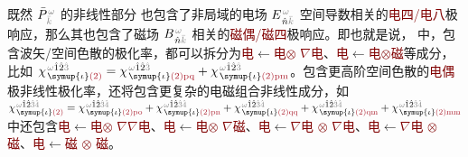 既然 $\bar{P}^{\;\!\mathcolor{gray}{\omega}}_{\;\!\mathcolor{gray}{\bar{k}}}$ 的非线性部分  也包含了非局域的电场 $E^{\;\!\mathcolor{gray}{\omega}}_{\;\! \hat{n} \mathcolor{gray}{\bar{k}}}$ 空间导数相关的\textcolor{Maroon}{电四/电八}极响应，那么其也包含了磁场 $B^{\;\!\mathcolor{gray}{\omega}}_{\;\! \hat{n} \mathcolor{gray}{\bar{k}}}$ 相关的\textcolor{Maroon}{磁偶/磁四}极响应。即也就是说， 中，包含波矢/空间色散的极化率，都可以拆分为\textcolor{Maroon}{电}$\leftarrow$\textcolor{Maroon}{电$\otimes$ $\nabla \text{电}$}、\textcolor{Maroon}{电}$\leftarrow$\textcolor{Maroon}{电$\otimes$磁}等成分，比如 $\chi^{\;\! \mathcolor{gray}{\omega} \hat{1} \hat{2} \mathcolor{gray}{\hat{3}}}_{\;\! \symup{\iota} \textcolor{Maroon}{(2)}} = \chi^{\;\! \mathcolor{gray}{\omega} \hat{1} \hat{2} \mathcolor{gray}{\hat{3}}}_{\;\! \symup{\iota} \textcolor{Maroon}{(2)\text{pq}}} + \chi^{\;\! \mathcolor{gray}{\omega} \hat{1} \hat{2} \mathcolor{gray}{\hat{3}}}_{\;\! \symup{\iota} \textcolor{Maroon}{(2)\text{pm}}}$。包含更高阶空间色散的\textcolor{Maroon}{电偶}极非线性极化率，还将包含更复杂的电磁组合非线性成分，如 $\chi^{\;\! \mathcolor{gray}{\omega} \hat{1} \hat{2} \mathcolor{gray}{\hat{3} \hat{4}}}_{\;\! \symup{\iota} \textcolor{Maroon}{(2)}} = \chi^{\;\! \mathcolor{gray}{\omega} \hat{1} \hat{2} \mathcolor{gray}{\hat{3} \hat{4}}}_{\;\! \symup{\iota} \textcolor{Maroon}{(2)\text{po}}} + \chi^{\;\! \mathcolor{gray}{\omega} \hat{1} \hat{2} \mathcolor{gray}{\hat{3} \hat{4}}}_{\;\! \symup{\iota} \textcolor{Maroon}{(2)\text{pn}}} + \chi^{\;\! \mathcolor{gray}{\omega} \hat{1} \hat{2} \mathcolor{gray}{\hat{3} \hat{4}}}_{\;\! \symup{\iota} \textcolor{Maroon}{(2)\text{qq}}} + \chi^{\;\! \mathcolor{gray}{\omega} \hat{1} \hat{2} \mathcolor{gray}{\hat{3} \hat{4}}}_{\;\! \symup{\iota} \textcolor{Maroon}{(2)\text{qm}}} + \chi^{\;\! \mathcolor{gray}{\omega} \hat{1} \hat{2} \mathcolor{gray}{\hat{3} \hat{4}}}_{\;\! \symup{\iota} \textcolor{Maroon}{(2)\text{mm}}}$ 中还包含\textcolor{Maroon}{电}$\leftarrow$\textcolor{Maroon}{电$\otimes$ $\nabla\nabla \text{电}$}、\textcolor{Maroon}{电}$\leftarrow$\textcolor{Maroon}{电$\otimes$ $\nabla \text{磁}$}、\textcolor{Maroon}{电}$\leftarrow$\textcolor{Maroon}{$\nabla \text{电}$ $\otimes$ $\nabla \text{电}$}、\textcolor{Maroon}{电}$\leftarrow$\textcolor{Maroon}{$\nabla \text{电}$ $\otimes$ 磁}、\textcolor{Maroon}{电}$\leftarrow$\textcolor{Maroon}{磁 $\otimes$ 磁}。

